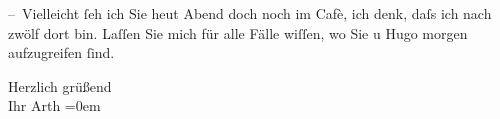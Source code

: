 \pstart
           {\pb}– Vielleicht{ }ſeh ich Sie heut Abend doch noch im
               Cafè, ich denk, daſs ich nach zwölf dort bin. Laſſen Sie mich für alle
               Fälle wiſſen, wo Sie u Hugo morgen {\pb}aufzugreifen{ }ſind.\pend
           
\pstart
           Herzlich grüßend{\\[\baselineskip]}Ihr \spacefill\mbox{Arth}\pend
           \leftskip=0em{}\endnumbering{}  \newcommand{\dateiname}{L00414}\newcommand{\titel}{Arthur Schnitzler an Richard Beer-Hofmann, [30. 3. 1895?]}\newcommand{\editorInnen}{Martin Anton Müller und Gerd-Hermann Susen}
